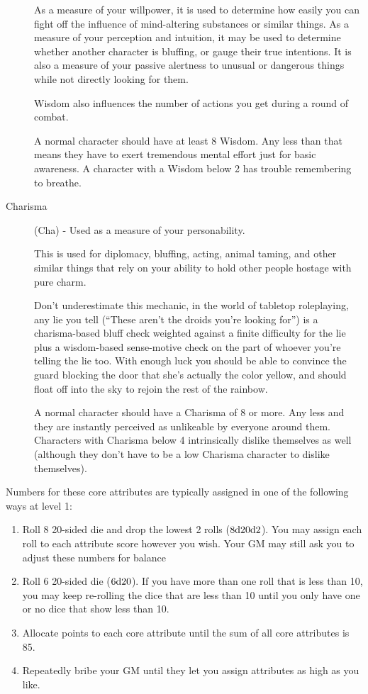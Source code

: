 \begin{description}
As a measure of your willpower, it is used to determine how easily you can fight off the influence of mind-altering substances or similar things. As a measure of your perception and intuition, it may be used to determine whether another character is bluffing, or gauge their true intentions. It is also a measure of your passive alertness to unusual or dangerous things while not directly looking for them. 

Wisdom also influences the number of actions you get during a round of combat.

A normal character should have at least 8 Wisdom. Any less than that means they have to exert tremendous mental effort just for basic awareness. A character with a Wisdom below 2 has trouble remembering to breathe.
\item[Charisma] (Cha) - Used as a measure of your personability.

This is used for diplomacy, bluffing, acting, animal taming, and other similar things that rely on your ability to hold other people hostage with pure charm.

Don't underestimate this mechanic, in the world of tabletop roleplaying, any lie you tell (“These aren’t the droids you’re looking for”) is a charisma-based bluff check weighted against a finite difficulty for the lie plus a wisdom-based sense-motive check on the part of whoever you're telling the lie too. With enough luck you should be able to convince the guard blocking the door that she's actually the color yellow, and should float off into the sky to rejoin the rest of the rainbow.

A normal character should have a Charisma of 8 or more. Any less and they are instantly perceived as unlikeable by everyone around them. Characters with Charisma below 4 intrinsically dislike themselves as well (although they don't have to be a low Charisma character to dislike themselves).
\end{description}

Numbers for these core attributes are typically assigned in one of the following ways at level 1:
\begin{enumerate}
\item Roll 8 20-sided die and drop the lowest 2 rolls ($8\mathrm{d}20\mathrm{d}2$). You may assign each roll to each attribute score however you wish. Your GM may still ask you to adjust these numbers for balance
\item Roll 6 20-sided die ($6\mathrm{d}20$). If you have more than one roll that is less than 10, you may keep re-rolling the dice that are less than 10 until you only have one or no dice that show less than 10.
\item Allocate points to each core attribute until the sum of all core attributes is 85.
\item Repeatedly bribe your GM until they let you assign attributes as high as you like.
\end{enumerate}

